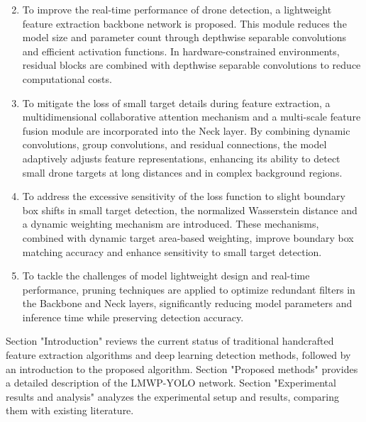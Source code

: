 \documentclass{article}
\begin{document}
\begin{enumerate}
  \setcounter{enumi}{1}
  \item To improve the real-time performance of drone detection, a lightweight feature extraction backbone network is proposed. This module reduces the model size and parameter count through depthwise separable convolutions and efficient activation functions. In hardware-constrained environments, residual blocks are combined with depthwise separable convolutions to reduce computational costs.
  \item To mitigate the loss of small target details during feature extraction, a multidimensional collaborative attention mechanism and a multi-scale feature fusion module are incorporated into the Neck layer. By combining dynamic convolutions, group convolutions, and residual connections, the model adaptively adjusts feature representations, enhancing its ability to detect small drone targets at long distances and in complex background regions.
  \item To address the excessive sensitivity of the loss function to slight boundary box shifts in small target detection, the normalized Wasserstein distance and a dynamic weighting mechanism are introduced. These mechanisms, combined with dynamic target area-based weighting, improve boundary box matching accuracy and enhance sensitivity to small target detection.
  \item To tackle the challenges of model lightweight design and real-time performance, pruning techniques are applied to optimize redundant filters in the Backbone and Neck layers, significantly reducing model parameters and inference time while preserving detection accuracy.
\end{enumerate}

Section "Introduction" reviews the current status of traditional handcrafted feature extraction algorithms and deep learning detection methods, followed by an introduction to the proposed algorithm. Section "Proposed methods" provides a detailed description of the LMWP-YOLO network. Section "Experimental results and analysis" analyzes the experimental setup and results, comparing them with existing literature. 
\end{document}
